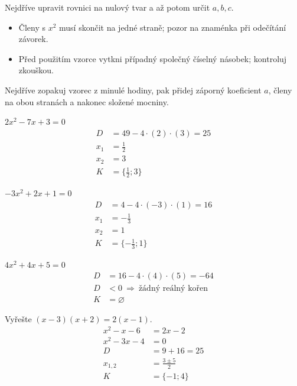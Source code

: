 \documentclass[11pt,a4paper]{article}
\begin{document}
Nejdříve upravit rovnici na nulový tvar a až potom určit $a,b,c$.
\begin{itemize}
\item Členy s $x^2$ musí skončit na jedné straně; pozor na znaménka při odečítání závorek.
\item Před použitím vzorce vytkni případný společný číselný násobek; kontroluj zkouškou.
\end{itemize}
Nejdříve zopakuj vzorec z minulé hodiny, pak přidej záporný koeficient $a$,
členy na obou stranách a nakonec složené mocniny.

\begin{prikladReseniBox}[title={Příklad 1}]
$2x^{2} - 7x + 3=0$
\tcblower
\[
\begin{aligned}
D&=49-4\cdot(2)\cdot(3)=25\\[2pt]
x_1&=\frac{1}{2}\\[2pt]
x_2&=3\\[2pt]
K&=\{\frac{1}{2};3\}
\end{aligned}
\]
\end{prikladReseniBox}
\begin{prikladReseniBox}[title={Příklad 2}]
$- 3x^{2} + 2x + 1=0$
\tcblower
\[
\begin{aligned}
D&=4-4\cdot(-3)\cdot(1)=16\\[2pt]
x_1&=- \frac{1}{3}\\[2pt]
x_2&=1\\[2pt]
K&=\{- \frac{1}{3};1\}
\end{aligned}
\]
\end{prikladReseniBox}
\begin{prikladReseniBox}[title={Příklad 3}]
$4x^{2} + 4x + 5=0$
\tcblower
\[
\begin{aligned}
D&=16-4\cdot(4)\cdot(5)=-64\\[2pt]
D&<0\ \Rightarrow\ \text{žádný reálný kořen}\\[2pt]
K&=\varnothing
\end{aligned}
\]
\end{prikladReseniBox}
\begin{prikladReseniBox}[title={Příklad 4}]
Vyřešte $(x-3)(x+2)=2(x-1)$.
\tcblower
\[\begin{aligned}
x^2-x-6&=2x-2\\x^2-3x-4&=0\\D&=9+16=25\\x_{1,2}&=\frac{3\pm5}{2}\\K&=\{-1;4\}
\end{aligned}\]
\end{prikladReseniBox}
\end{document}
